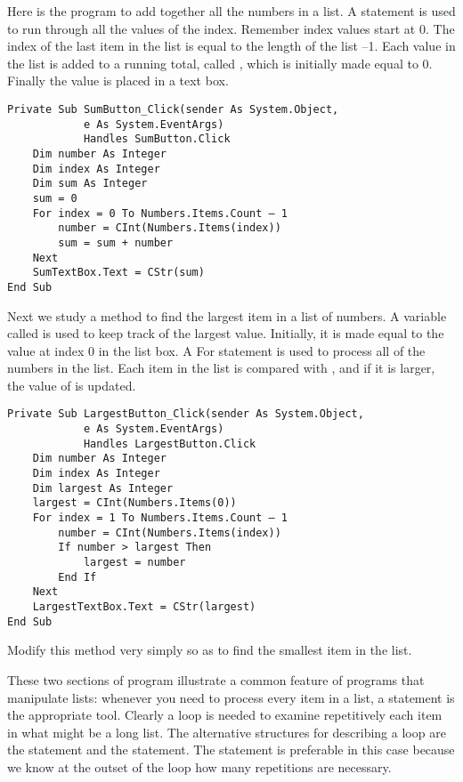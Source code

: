 		Here is the program to add together all the numbers in a list. A  statement is used to run through all the values of the index. Remember index values start at 0. The index of the last item in the list is equal to the length of the list –1. Each value in the list is added to a running total, called , which is initially made equal to 0. Finally the value is placed in a text box.
		\begin{lstlisting}
Private Sub SumButton_Click(sender As System.Object,
			e As System.EventArgs)
			Handles SumButton.Click
	Dim number As Integer
	Dim index As Integer
	Dim sum As Integer
	sum = 0
	For index = 0 To Numbers.Items.Count – 1
		number = CInt(Numbers.Items(index))
		sum = sum + number
	Next 
	SumTextBox.Text = CStr(sum)
End Sub
		\end{lstlisting}
		Next we study a method to find the largest item in a list of numbers. A variable called  is used to keep track of the largest value. Initially, it is made equal to the value at index 0 in the list box. A For statement is used to process all of the numbers in the list. Each item in the list is compared with , and if it is larger, the value of  is updated.
		\begin{lstlisting}
Private Sub LargestButton_Click(sender As System.Object,
			e As System.EventArgs)
			Handles LargestButton.Click
	Dim number As Integer
	Dim index As Integer
	Dim largest As Integer
	largest = CInt(Numbers.Items(0))
	For index = 1 To Numbers.Items.Count – 1
		number = CInt(Numbers.Items(index))
		If number > largest Then
			largest = number
		End If
	Next 
	LargestTextBox.Text = CStr(largest)
End Sub
		\end{lstlisting}

		\begin{stqb}
			\begin{STQ}
				\item Modify this method very simply so as to find the smallest item in the list.
			\end{STQ}
		\end{stqb}
		These two sections of program illustrate a common feature of programs that manipulate lists: whenever you need to process every item in a list, a  statement is the appropriate tool. Clearly a loop is needed to examine repetitively each item in what might be a long list. The alternative structures for describing a loop are the  statement and the  statement. The  statement is preferable in this case because we know at the outset of the loop how many repetitions are necessary.


